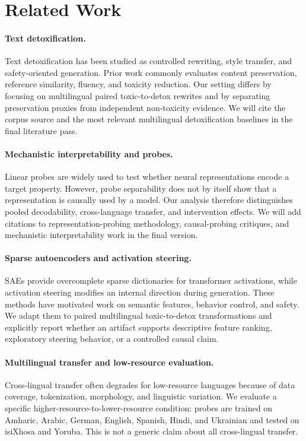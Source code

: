 \section{Related Work}

\paragraph{Text detoxification.}
Text detoxification has been studied as controlled rewriting, style transfer, and
safety-oriented generation. Prior work commonly evaluates content preservation,
reference similarity, fluency, and toxicity reduction. Our setting differs by focusing
on multilingual paired toxic-to-detox rewrites and by separating preservation proxies
from independent non-toxicity evidence. We will cite the corpus source and the most
relevant multilingual detoxification baselines in the final literature pass.

\paragraph{Mechanistic interpretability and probes.}
Linear probes are widely used to test whether neural representations encode a target
property. However, probe separability does not by itself show that a representation is
causally used by a model. Our analysis therefore distinguishes pooled decodability,
cross-language transfer, and intervention effects. We will add citations to
representation-probing methodology, causal-probing critiques, and mechanistic
interpretability work in the final version.

\paragraph{Sparse autoencoders and activation steering.}
SAEs provide overcomplete sparse dictionaries for transformer activations, while
activation steering modifies an internal direction during generation. These methods
have motivated work on semantic features, behavior control, and safety. We adapt them
to paired multilingual toxic-to-detox transformations and explicitly report whether an
artifact supports descriptive feature ranking, exploratory steering behavior, or a
controlled causal claim.

\paragraph{Multilingual transfer and low-resource evaluation.}
Cross-lingual transfer often degrades for low-resource languages because of data
coverage, tokenization, morphology, and linguistic variation. We evaluate a specific
higher-resource-to-lower-resource condition: probes are trained on Amharic, Arabic,
German, English, Spanish, Hindi, and Ukrainian and tested on isiXhosa and Yoruba.
This is not a generic claim about all cross-lingual transfer.
